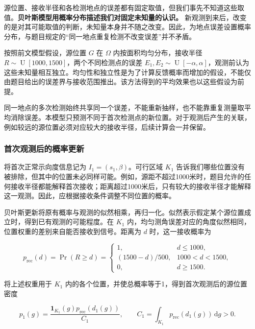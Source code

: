 源位置、接收半径和各检测地点的误差都有固定取值，但我们事先不知道这些取值。\textbf{贝叶斯模型用概率分布描述我们对固定未知量的认识。} 新观测到来后，改变的是对其可能取值的判断，未知量本身并不随之改变。因此，为地点误差设置概率分布，与题目规定的“同一地点重复检测不改变误差”并不矛盾。

按照前文模型假设，源位置 \(G\) 在 \(\Omega\) 内按面积均匀分布，接收半径 \(R\sim\operatorname{U}[1000,1500]\)，两个不同检测点的误差 \(E_1,E_2\sim\operatorname{U}[-\alpha,\alpha]\)，观测前认为这些未知量相互独立。均匀性和独立性是为了计算反馈概率而增加的假设，不能仅由题目给出的误差界与接收范围推出。该方法得到的平均效果也以这些假设为前提。

同一地点的多次检测始终共享同一个误差，不能重新抽样，也不能靠重复测量取平均消除误差。本模型只预测不同于首次检测点的新位置。对于观测后产生的关联，例如较远的源位置必须对应较大的接收半径，后续计算会一并保留。

\subsubsection{首次观测后的概率更新}

将首次正常示向度信息记为 \(I_1=(s_1,\beta)\)。可行区域 \(K_1\) 告诉我们哪些位置没有被排除，但其中的位置未必同样可能。例如，源距不超过1000米时，题目允许的任何接收半径都能解释首次接收；距离超过1000米后，只有较大的接收半径才能解释这一观测。因此，应根据接收条件调整不同位置的概率。

贝叶斯更新将原有概率与观测的似然相乘，再归一化。似然表示假定某个源位置成立时，得到已有观测的可能程度。在 \(K_1\) 内，均匀测角误差对应的角度似然相同，位置权重的差别来自能否接收到信号。距离为 \(d\) 时，这一接收概率为

\begin{equation}
 p_{\mathrm{rec}}(d)=\Pr(R\ge d)=
 \begin{cases}
 1,&d\le1000,\\
 (1500-d)/500,&1000<d<1500,\\
 0,&d\ge1500.
 \end{cases}
\label{eq:q2-pair-weight}
\end{equation}

将上述权重用于 \(K_1\) 内的各个位置，并使总概率等于1，得到首次观测后的源位置密度

\begin{equation}
 p_1(g)=\frac{\mathbf1_{K_1}(g)p_{\mathrm{rec}}(d_1(g))}{C_1},
 \qquad C_1=\int_{K_1}p_{\mathrm{rec}}(d_1(g))\,\mathrm dg>0.
\label{eq:q2-pair-posterior}
\end{equation}

